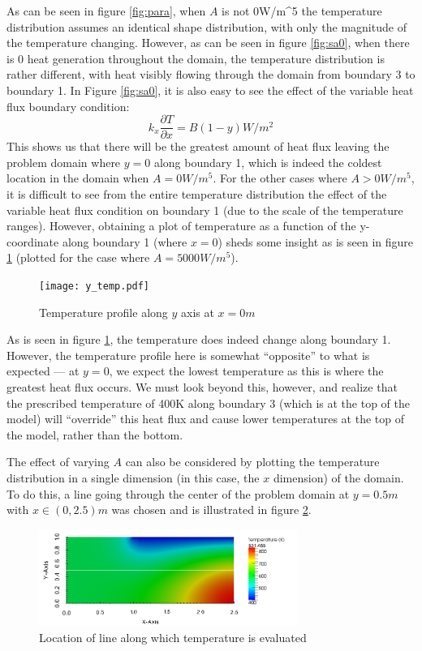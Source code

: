 \documentclass[letterpaper,10pt]{article}
\begin{document}
As can be seen in figure \ref{fig:para}, when $A$ is not \unit{0}{W/m^5} the temperature distribution assumes an identical shape distribution, with only the magnitude of the temperature changing. However, as can be seen in figure \ref{fig:sa0}, when there is 0 heat generation throughout the domain, the temperature distribution is rather different, with heat visibly flowing through the domain from boundary 3 to boundary 1. In Figure \ref{fig:sa0}, it is also easy to see the effect of the variable heat flux boundary condition:
\[k_x\frac{\partial T}{\partial x} = B \left(1-y\right) \unit{}{W/m^2}\]
\noindent This shows us that there will be the greatest amount of heat flux leaving the problem domain where $y=0$ along boundary 1, which is indeed the coldest location in the domain when $A=\unit{0}{W/m^5}$. For the other cases where $A > \unit{0}{W/m^5}$, it is difficult to see from the entire temperature distribution the effect of the variable heat flux condition on boundary 1 (due to the scale of the temperature ranges). However, obtaining a plot of temperature as a function of the y-coordinate along boundary 1 (where $x=0$) sheds some insight as is seen in figure \ref{fig:y_temp} (plotted for the case where $A=\unit{5000}{W/m^5}$).

\begin{figure}[H]
	\centering
	\texttt{[image: y\_temp.pdf]}
	\caption{Temperature profile along $y$ axis at $x=\unit{0}{m}$}
	\label{fig:y_temp}
\end{figure}

As is seen in figure \ref{fig:y_temp}, the temperature does indeed change along boundary 1. However, the temperature profile here is somewhat ``opposite'' to what is expected --- at $y=0$, we expect the lowest temperature as this is where the greatest heat flux occurs. We must look beyond this, however, and realize that the prescribed temperature of \unit{400}{K} along boundary 3 (which is at the top of the model) will ``override'' this heat flux and cause lower temperatures at the top of the model, rather than the bottom.

The effect of varying $A$ can also be considered by plotting the temperature distribution in a single dimension (in this case, the $x$ dimension) of the domain. To do this, a line going through the center of the problem domain at $y=\unit{0.5}{m}$ with $x\in\unit{(0, 2.5)}{m}$ was chosen and is illustrated in figure \ref{fig:studyline}.

\begin{figure}[H]
	\centering
	\includegraphics[width=0.75\textwidth]{studyline.png}
	\caption{Location of line along which temperature is evaluated}
	\label{fig:studyline}
\end{figure}
\end{document}
